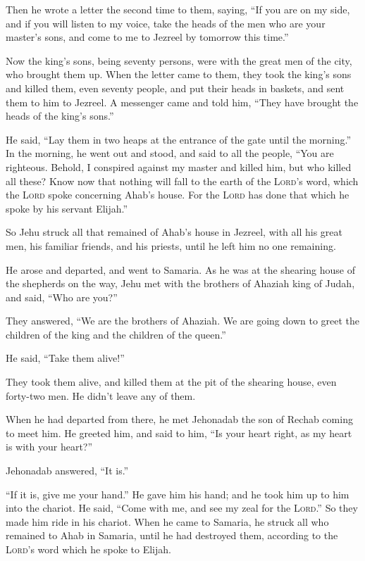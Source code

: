  Then he wrote a letter the second time to them, saying,
``If you are on my side, and if you will listen to my voice, take the
heads of the men who are your master's sons, and come to me to Jezreel
by tomorrow this time.''

Now the king's sons, being seventy persons, were with the great men of
the city, who brought them up.  When the letter came to
them, they took the king's sons and killed them, even seventy people,
and put their heads in baskets, and sent them to him to Jezreel.
 A messenger came and told him, ``They have brought the
heads of the king's sons.''

He said, ``Lay them in two heaps at the entrance of the gate until the
morning.''  In the morning, he went out and stood, and
said to all the people, ``You are righteous. Behold, I conspired against
my master and killed him, but who killed all these?  Know
now that nothing will fall to the earth of the \textsc{Lord}'s word,
which the \textsc{Lord} spoke concerning Ahab's house. For the
\textsc{Lord} has done that which he spoke by his servant Elijah.''

 So Jehu struck all that remained of Ahab's house in
Jezreel, with all his great men, his familiar friends, and his priests,
until he left him no one remaining.

 He arose and departed, and went to Samaria. As he was at
the shearing house of the shepherds on the way,  Jehu met
with the brothers of Ahaziah king of Judah, and said, ``Who are you?''

They answered, ``We are the brothers of Ahaziah. We are going down to
greet the children of the king and the children of the queen.''

 He said, ``Take them alive!''

They took them alive, and killed them at the pit of the shearing house,
even forty-two men. He didn't leave any of them.

 When he had departed from there, he met Jehonadab the
son of Rechab coming to meet him. He greeted him, and said to him, ``Is
your heart right, as my heart is with your heart?''

Jehonadab answered, ``It is.''

``If it is, give me your hand.'' He gave him his hand; and he took him
up to him into the chariot.  He said, ``Come with me, and
see my zeal for the \textsc{Lord}.'' So they made him ride in his
chariot.  When he came to Samaria, he struck all who
remained to Ahab in Samaria, until he had destroyed them, according to
the \textsc{Lord}'s word which he spoke to Elijah.

